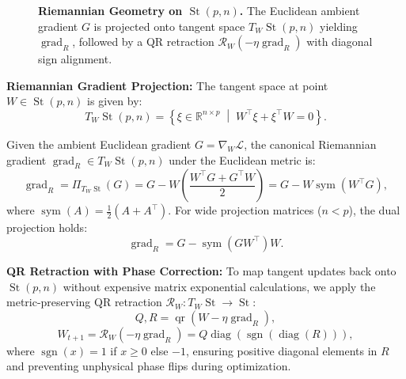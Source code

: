 \begin{figure}[t]
\centering
\caption{\textbf{Riemannian Geometry on $\operatorname{St}(p, n)$.} The Euclidean ambient gradient $G$ is projected onto tangent space $T_W \operatorname{St}(p, n)$ yielding $\operatorname{grad}_R$, followed by a QR retraction $\mathcal{R}_W(-\eta \operatorname{grad}_R)$ with diagonal sign alignment.}
\label{fig:stiefel_geom}
\end{figure}

\textbf{Riemannian Gradient Projection:} The tangent space at point $W \in \operatorname{St}(p, n)$ is given by:
\begin{equation}
T_W \operatorname{St}(p, n) = \left\{ \xi \in \mathbb{R}^{n \times p} \;\middle|\; W^\top \xi + \xi^\top W = 0 \right\}.
\end{equation}

Given the ambient Euclidean gradient $G = \nabla_W \mathcal{L}$, the canonical Riemannian gradient $\operatorname{grad}_R \in T_W \operatorname{St}(p, n)$ under the Euclidean metric is:
\begin{equation}
\label{eq:stiefel_grad}
\operatorname{grad}_R = \Pi_{T_W \operatorname{St}}(G) = G - W \left(\frac{W^\top G + G^\top W}{2}\right) = G - W \operatorname{sym}(W^\top G),
\end{equation}
where $\operatorname{sym}(A) = \frac{1}{2}(A + A^\top)$. For wide projection matrices ($n < p$), the dual projection holds:
\begin{equation}
\operatorname{grad}_R = G - \operatorname{sym}(G W^\top) W.
\end{equation}

\textbf{QR Retraction with Phase Correction:} To map tangent updates back onto $\operatorname{St}(p, n)$ without expensive matrix exponential calculations, we apply the metric-preserving QR retraction $\mathcal{R}_W: T_W \operatorname{St} \to \operatorname{St}$:
\begin{equation}
Q, R = \operatorname{qr}(W - \eta \operatorname{grad}_R),
\end{equation}
\begin{equation}
W_{t+1} = \mathcal{R}_W(-\eta \operatorname{grad}_R) = Q \operatorname{diag}(\operatorname{sgn}(\operatorname{diag}(R))),
\end{equation}
where $\operatorname{sgn}(x) = 1$ if $x \ge 0$ else $-1$, ensuring positive diagonal elements in $R$ and preventing unphysical phase flips during optimization.

